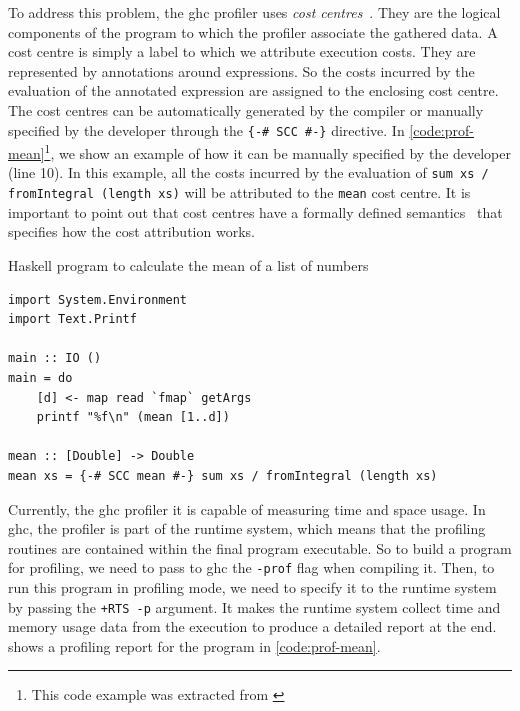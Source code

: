 To address this problem, the \ac{ghc} profiler uses \emph{cost centres}~\citep{sansom:1995}. They are the logical components of the program to which the profiler associate the gathered data. A cost centre is simply a label to which we attribute execution costs. They are represented by annotations around expressions. So the costs incurred by the evaluation of the annotated expression are assigned to the enclosing cost centre. The cost centres can be automatically generated by the compiler or manually specified by the developer through the \texttt{\{-\# SCC \#-\}} directive. In \autoref{code:prof-mean}\footnote{This code example was extracted from \cite{sullivan:2008}}, we show an example of how it can be manually specified by the developer (line 10). In this example, all the costs incurred by the evaluation of \texttt{sum xs / fromIntegral (length xs)} will be attributed to the \texttt{mean} cost centre. It is important to point out that cost centres have a formally defined semantics~\citep{sansom:1995} that specifies how the cost attribution works.

\begin{listing}
  \caption{Haskell program to calculate the mean of a list of numbers}
  \begin{verbatim}
import System.Environment
import Text.Printf

main :: IO ()
main = do
    [d] <- map read `fmap` getArgs
    printf "%f\n" (mean [1..d])

mean :: [Double] -> Double
mean xs = {-# SCC mean #-} sum xs / fromIntegral (length xs)
  \end{verbatim}
  \label{code:prof-mean}
\end{listing}

Currently, the \ac{ghc} profiler it is capable of measuring time and space usage. In \ac{ghc}, the profiler is part of the runtime system, which means that the profiling routines are contained within the final program executable. So to build a program for profiling, we need to pass to \ac{ghc} the \texttt{-prof} flag when compiling it. Then, to run this program in profiling mode, we need to specify it to the runtime system by passing the \texttt{+RTS -p} argument. It makes the runtime system collect time and memory usage data from the execution to produce a detailed report at the end.  shows a profiling report for the program in \autoref{code:prof-mean}.

